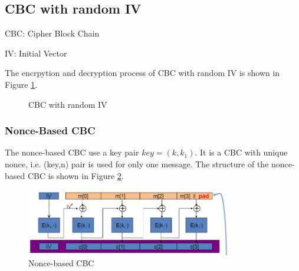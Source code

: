 \subsection{CBC with random IV}

CBC: Cipher Block Chain

IV: Initial Vector

The encrpytion and decryption process of CBC with random IV is shown in Figure \ref{fig: 03 CBC with random IV}.

\begin{figure}[h]
    \caption{CBC with random IV}
    \label{fig: 03 CBC with random IV}
\end{figure}

\subsubsection{Nonce-Based CBC}

The nonce-based CBC use a key pair $key=(k,k_1)$. It is a CBC with unique nonce, i.e. (key,n) pair is used for only one message. The structure of the nonce-based CBC is shown in Figure \ref{fig: 03 nonce-based CBC}.

\begin{figure}[h]
    \centering
    \includegraphics[width=0.8\textwidth]{Stanford_Crypto_1/fig/03_block_cipher/nonc-based CBC.png}
    \caption{Nonce-based CBC}
    \label{fig: 03 nonce-based CBC}
\end{figure}

